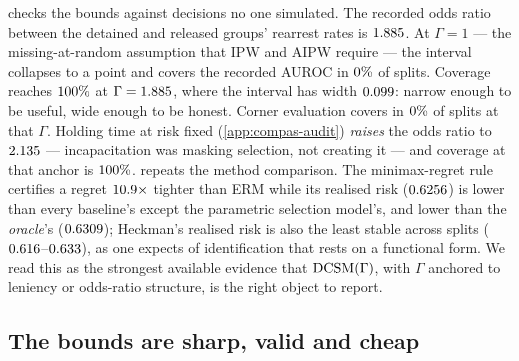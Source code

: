  checks the bounds against decisions no one simulated. The
recorded odds ratio between the detained and released groups' rearrest rates
is $1.885$. At $\Gamma=1$ --- the missing-at-random assumption that IPW
and AIPW require --- the interval collapses to a point and covers the recorded
AUROC in $0\%$ of splits. Coverage reaches $100\%$ at
$\Gamma=1.885$, where the interval has width $0.099$: narrow
enough to be useful, wide enough to be honest. Corner evaluation covers in
$0\%$ of splits at that $\Gamma$. Holding time at risk fixed
(\cref{app:compas-audit}) \emph{raises} the odds ratio to $2.135$ ---
incapacitation was masking selection, not creating it --- and coverage at that
anchor is $100\%$.  repeats the method
comparison. The minimax-regret rule certifies a regret
$10.9\times$ tighter than ERM while its realised risk
($0.6256$) is lower than every baseline's except the
parametric selection model's, and lower than the \emph{oracle}'s
($0.6309$); Heckman's realised risk is also the least stable
across splits ($0.616$--$0.633$), as one
expects of identification that rests on a functional form. We read this as
the strongest available evidence that $\textup{DCSM}(\Gamma)$, with $\Gamma$ anchored
to leniency or odds-ratio structure, is the right object to report.



\subsection{The bounds are sharp, valid and cheap}
\label{sec:exp-sharp}


